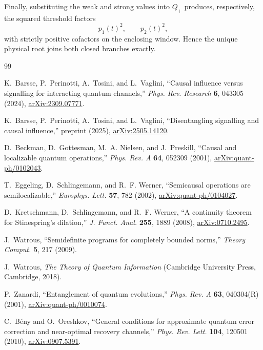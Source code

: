 \documentclass[11pt,a4paper]{article}
\theoremstyle{remark}
\begin{document}
Finally, substituting the weak and strong values into $Q_+$ produces,
respectively, the squared threshold factors
\[
 p_1(t)^2,\qquad p_2(t)^2,
\]
with strictly positive cofactors on the enclosing window.  Hence the unique
physical root joins both closed branches exactly.

\begin{thebibliography}{99}

K.~Barsse, P.~Perinotti, A.~Tosini, and L.~Vaglini,
``Causal influence versus signalling for interacting quantum channels,''
\emph{Phys. Rev. Research} \textbf{6}, 043305 (2024),
\href{https://arxiv.org/abs/2309.07771}{arXiv:2309.07771}.

K.~Barsse, P.~Perinotti, A.~Tosini, and L.~Vaglini,
``Disentangling signalling and causal influence,'' preprint (2025),
\href{https://arxiv.org/abs/2505.14120}{arXiv:2505.14120}.

D.~Beckman, D.~Gottesman, M.~A. Nielsen, and J.~Preskill,
``Causal and localizable quantum operations,''
\emph{Phys. Rev. A} \textbf{64}, 052309 (2001),
\href{https://arxiv.org/abs/quant-ph/0102043}{arXiv:quant-ph/0102043}.

T.~Eggeling, D.~Schlingemann, and R.~F. Werner,
``Semicausal operations are semilocalizable,''
\emph{Europhys. Lett.} \textbf{57}, 782 (2002),
\href{https://arxiv.org/abs/quant-ph/0104027}{arXiv:quant-ph/0104027}.

D.~Kretschmann, D.~Schlingemann, and R.~F. Werner,
``A continuity theorem for Stinespring's dilation,''
\emph{J. Funct. Anal.} \textbf{255}, 1889 (2008),
\href{https://arxiv.org/abs/0710.2495}{arXiv:0710.2495}.

J.~Watrous, ``Semidefinite programs for completely bounded norms,''
\emph{Theory Comput.} \textbf{5}, 217 (2009).

J.~Watrous, \emph{The Theory of Quantum Information}
(Cambridge University Press, Cambridge, 2018).

P.~Zanardi, ``Entanglement of quantum evolutions,''
\emph{Phys. Rev. A} \textbf{63}, 040304(R) (2001),
\href{https://arxiv.org/abs/quant-ph/0010074}{arXiv:quant-ph/0010074}.

C.~B\'eny and O.~Oreshkov,
``General conditions for approximate quantum error correction and
near-optimal recovery channels,''
\emph{Phys. Rev. Lett.} \textbf{104}, 120501 (2010),
\href{https://arxiv.org/abs/0907.5391}{arXiv:0907.5391}.


\end{thebibliography}
\end{document}
